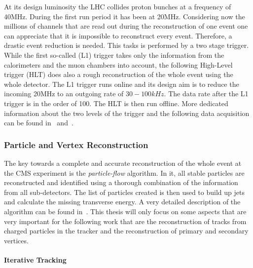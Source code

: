 At its design luminosity the LHC collides proton bunches at a frequency of 40\unit{MHz}. During the first run period it has been at 20\unit{MHz}. Considering now the millions of channels that are read out during the reconstruction of one event one can appreciate that it is impossible to reconstruct every event. Therefore, a drastic event reduction is needed. This tasks is performed by a two stage trigger. While the first so-called \Lone{} (L1) trigger takes only the information from the calorimeters and the muon chambers into account, the following High-Level trigger (HLT) does also a rough reconstruction of the whole event using the whole detector. The L1 trigger runs online and its design aim is to reduce the incoming 20\unit{MHz} to an outgoing rate of $30-100\unit{kHz}$. The data rate after the L1 trigger is in the order of 100\GBytes{}. The HLT is then run offline. More dedicated information about the two levels of the trigger and the following data acquisition can be found in~ and~.

\subsubsection{Particle and Vertex Reconstruction \label{sec:LHCCMSPaVR}}

The key towards a complete and accurate reconstruction of the whole event at the CMS experiment is the \textit{particle-flow} algorithm. In it, all stable particles are reconstructed and identified using a thorough combination of the information from all sub-detectors. The list of particles created is then used to build up jets and calculate the missing transverse energy. A very detailed description of the algorithm can be found in~. This thesis will only focus on some aspects that are very important for the following work that are the reconstruction of tracks from charged particles in the tracker and the reconstruction of primary and secondary vertices.

\paragraph*{Iterative Tracking}

